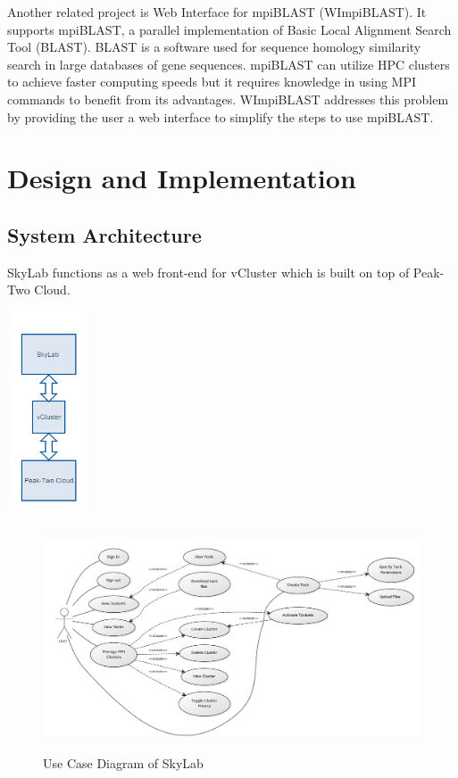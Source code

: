Another related project is Web Interface for mpiBLAST (WImpiBLAST). It supports mpiBLAST, a parallel implementation of Basic Local Alignment Search Tool (BLAST). BLAST is a software used for sequence homology similarity search in large databases of gene sequences. mpiBLAST can utilize HPC clusters to achieve faster computing speeds but it requires knowledge in using MPI commands to benefit from its advantages. WImpiBLAST addresses this problem by providing the user a web interface to simplify the steps to use mpiBLAST\cite{9686120720140601}.   
            
        
\section{Design and Implementation}

\subsection{System Architecture}
SkyLab functions as a web front-end for vCluster which is built on top of Peak-Two Cloud.
	\begin{center}			
		\includegraphics[width=92px,height=224px]{./images/system_architecture.png}			
	\end{center}	
    



	
    \begin{figure}[ht]
      \centering
      \includegraphics[width=500px,height=250px]{./images/use_case_large.png}
      \caption{Use Case Diagram of SkyLab}\label{System Architecture}
    \end{figure}


